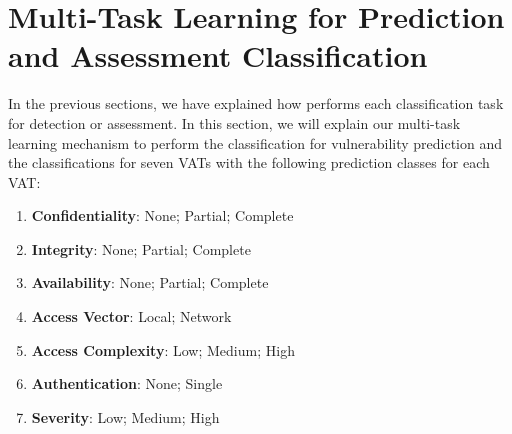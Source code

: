 \section{Multi-Task Learning for Prediction and Assessment Classification}
\label{multi-task:sec}

In the previous sections, we have explained how {\tool} performs each
classification task for detection or assessment.
In this section, we will explain our multi-task learning mechanism to
perform the classification for vulnerability prediction and the
classifications for seven VATs with the following prediction
classes for each VAT:

\begin{enumerate}
	\item {\bf Confidentiality}: None; Partial; Complete
	\item {\bf Integrity}: None; Partial; Complete
	\item {\bf Availability}: None; Partial; Complete
	\item {\bf Access Vector}: Local; Network
	\item {\bf Access Complexity}: Low; Medium; High
	\item {\bf Authentication}: None; Single
	\item {\bf Severity}: Low; Medium; High
\end{enumerate}




